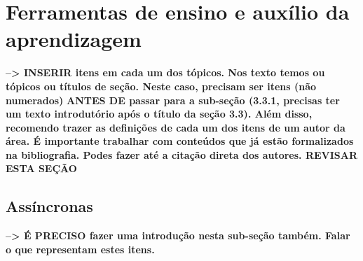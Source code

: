 \section{Ferramentas de ensino e auxílio da aprendizagem}%
\label{sec:aprend}
\textbf{--> INSERIR itens em cada um dos tópicos. Nos texto temos ou tópicos ou títulos de seção. Neste caso, precisam ser itens (não numerados)}
\textbf{ANTES DE passar para a sub-seção (3.3.1, precisas ter um texto introdutório após o título da seção 3.3). Além disso, recomendo trazer as definições de cada um dos itens de um autor da área. É importante trabalhar com conteúdos que já estão formalizados na bibliografia. Podes fazer até a citação direta dos autores. REVISAR ESTA SEÇÃO}
\subsection{Assíncronas}%
\textbf{--> É PRECISO fazer uma introdução nesta sub-seção também. Falar o que representam estes itens.}
